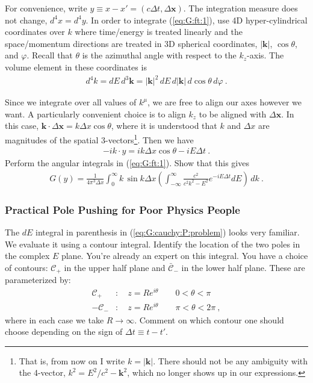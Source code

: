 \documentclass[12pt]{article}
\numberwithin{equation}{subsection}    %
\renewcommand{\vec}[1]{\mathbf{#1}} %
\begin{document}
For convenience, write $y \equiv x-x' = (c\Delta t,\Delta \mathbf{x})$. The integration measure does not change, $d^4x = d^4 y$. In order to integrate (\ref{eq:G:ft:1}), use 4D hyper-cylindrical coordinates over $k$ where time/energy is treated linearly and the space/momentum directions are treated in 3D spherical coordinates, $|\vec k|$, $\cos \theta$, and $\varphi$. Recall that $\theta$ is the azimuthal angle with respect to the $k_z$-axis. The volume element in these coordinates is
\begin{align}
	d^4 k = dE \, d^3\vec k = |\vec k|^2 \,dE \,  d|\vec k| \, d\cos \theta \, d\varphi \ .
\end{align}

Since we integrate over all values of $k^\mu$, we are free to align our axes however we want. A particularly convenient choice is to align $k_z$ to be aligned with $\Delta\vec x$. In this case, $\vec k \cdot \Delta\vec x = k\Delta x \cos \theta$, where it is understood that $k$ and $\Delta x$ are magnitudes of the spatial $3$-vectors\footnote{That is, from now on I write $k = |\vec k|$. There should not be any ambiguity with the 4-vector, $k^2 = E^2/c^2 - \vec k^2$, which no longer shows up in our expressions.}.
%
Then we have
\begin{align}
	-ik\cdot y = i k \Delta x \cos \theta  - i E \Delta t \ .
\end{align}
Perform the angular integrals in (\ref{eq:G:ft:1}).  Show that this gives
\begin{align}
	G(y) = \frac{1}{4\pi^3 \Delta x} \int_0^\infty k\,\sin k\Delta x 
	\left(
	 \int_{-\infty}^\infty \frac{c^2}{c^2k^2 - E^2} e^{-iE \Delta t} dE
	\right) \, dk \ .
	\label{eq:G:cauchy:P:problem}
\end{align}





\subsubsection{Practical Pole Pushing for Poor Physics People}

The $dE$ integral in parenthesis in (\ref{eq:G:cauchy:P:problem}) looks very familiar. We evaluate it using a contour integral. Identify the location of the two poles in the complex $E$ plane.
%
You're already an expert on this integral.
%
You have a choice of contours: $\mathcal C_+$ in the upper half plane and $\bar{\mathcal C}_-$ in the lower half plane. These are parameterized by:
\begin{align}
	\mathcal C_+ &: \quad z = Re^{i\theta} \qquad  0 < \theta < \pi \\
	-{\mathcal C}_- &: \quad z = Re^{i\theta} \qquad \pi < \theta < 2 \pi \ ,
\end{align}
where in each case we take $R\to \infty$.
Comment on which contour one should choose depending on the sign of $\Delta t\equiv t-t'$.
\end{document}
